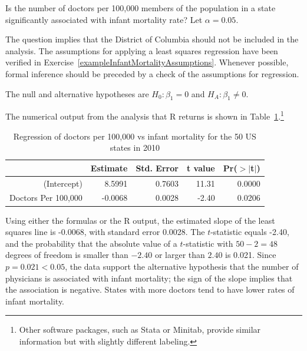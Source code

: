 \begin{example}{Is the number of doctors per 100,000 members of the population in a state significantly associated with infant mortality rate? Let $\alpha = 0.05$. }
	
The question implies that the District of Columbia should not be included in the analysis. The assumptions for applying a least squares regression have been verified in Exercise~\ref{exampleInfantMortalityAssumptions}. Whenever possible, formal inference should be preceded by a check of the assumptions for regression.

The null and alternative hypotheses are $H_0:\beta_1 = 0$ and $H_A:\beta_1 \neq 0.$	

The numerical output from the analysis that \textsf{R} returns is shown in Table~\ref{infantMortalityInferenceOutput}.\footnote{Other software packages, such as Stata or Minitab, provide similar information but with slightly different labeling.} 

\begin{table}[ht]
	\centering
	\begin{tabular}{rrrrr}
		\hline
		& Estimate & Std. Error & t value & Pr($>$$|$t$|$) \\ 
		\hline
		(Intercept) & 8.5991 & 0.7603 & 11.31 & 0.0000 \\ 
		Doctors Per 100,000 & -0.0068 & 0.0028 & -2.40 & 0.0206 \\ 
		\hline
	\end{tabular}
	\caption{Regression of doctors per 100,000 vs infant mortality for the 50 US states in 2010}
	\label{infantMortalityInferenceOutput}
\end{table}


Using either the formulas or the \textsf{R} output, the estimated slope of the least squares line is -0.0068, with standard error 0.0028. The $t$-statistic equals -2.40, and the probability that the absolute value of a $t$-statistic with $50-2=48$ degrees of freedom is smaller than  $-2.40$ or larger than $2.40$ is 0.021. Since $p = 0.021 < 0.05$, the data support the alternative hypothesis that the number of physicians is associated with infant mortality; the sign of the slope implies that the association is negative.  States with more doctors tend to have lower rates of infant mortality.


\end{example}
